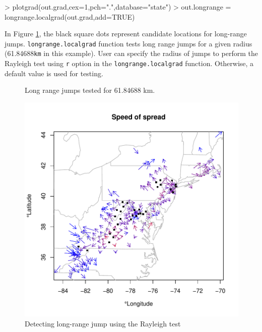 \documentclass{article}
\newcommand{\code}[1]{{\tt #1}}
\begin{document}
\begin{Schunk}
\begin{Sinput}
> plotgrad(out.grad,cex=1,pch=".",database="state")
> out.longrange = longrange.localgrad(out.grad,add=TRUE)
\end{Sinput}
\end{Schunk}
In Figure \ref{rayleigh}, the black square dots represent candidate locations for long-range jumps. \code{longrange.localgrad} function tests long range jumps for a given radius (61.84688{\tt km} in this example). User can specify the radius of jumps to perform the Rayleigh test using \code{r} option in the \code{longrange.localgrad} function. Otherwise, a default value is used for testing.


\begin{figure}
\begin{center}
\begin{Schunk}
\begin{Soutput}
Long range jumps tested for  61.84688 km.
\end{Soutput}
\end{Schunk}
\includegraphics{invasionSpeed_doc-011}
\end{center}
\caption{Detecting long-range jump using the Rayleigh test}
\label{rayleigh}
\end{figure}
\end{document}
